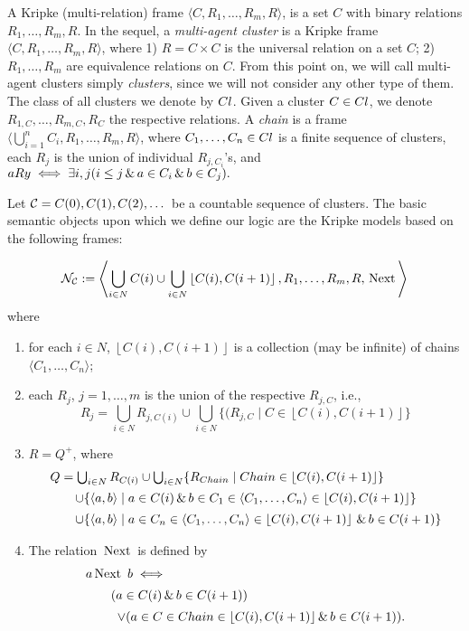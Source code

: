 \documentclass[runningheads]{llncs}
\begin{document}
  A Kripke (multi-relation) frame
  $\langle C, R_1,\dots, R_m, R\rangle$, is a set $C$ with binary relations
  $R_1,\dots, R_m, R$.
  In the sequel, a \emph{multi-agent cluster} is a Kripke frame
  $\langle C,R_1,\dots, R_m, R\rangle$,
  where
  1) $R=C\times C$ is the universal relation on a set $C$;
  2) $R_1,\dots, R_m$ are equivalence relations on $C$.
    From this point on, we will call multi-agent clusters simply \emph{clusters},
  since we will not consider any other type of them.
  The class of all clusters we denote by $\mathop{Cl}\nolimits$.
    Given a cluster $C\in\mathop{Cl}\nolimits$, we denote
  $R_{1,C},\dots,R_{m,C},R_C$ the respective relations.
  A \emph{chain} is a frame
  $\langle\bigcup_{i=1}^n C_i,R_1,\dots, R_m, R\rangle$,
  where $C_1,\dots,C_n\in\mathop{Cl}\nolimits$ is a finite sequence
  of clusters, each $R_j$ is the union of individual
  $R_{j,C_i}$'s,
  and
  $  a R y \iff \exists i,j
  (i\leq j \,\&\, a\in C_i \,\&\, b\in C_{j}).
  $

    Let $\mathcal{C}=C(0),C(1),C(2),\dots$ be
  a countable sequence of clusters.
    The basic semantic objects upon which we define our logic are the
Kripke models based on the following frames:

 \[
\mathcal{N_C} :=
\left\langle
 \bigcup_{i\in N} C(i)\cup
\bigcup_{i\in N} \left\lfloor C(i),C(i+1)\right\rfloor,
R_1,\dots, R_m,
R, \,\mathrm{Next}\,
\right\rangle
\]
where
\begin{enumerate}
\item
  for each $i\in{N}$,
  $\left\lfloor C(i),C(i+1)\right\rfloor$
  is a collection (may be infinite) of chains $\langle C_1,\dots,C_n\rangle$;
\item
each $R_j$, $j=1,\dots,m$ is the union
of the respective $R_{j,C}$, i.e.,
$$
R_j=
\bigcup_{i\in {N}} R_{j,C(i)}\cup
\bigcup_{i\in {N}}
\{ (R_{j,C}\mid
C\in\left\lfloor C(i),C(i+1)\right\rfloor\}
$$
\item
  $R=Q^+$, where
$$
\begin{array}{l}
Q=
\bigcup_{i\in {N}} R_{C(i)}\cup
\bigcup_{i\in {N}}
\{ R_{Chain}\mid
Chain\in\left\lfloor C(i),C(i+1)\right\rfloor\}\\[0.5em]
\hskip2em
\cup
\{\langle a,b\rangle \mid a\in C(i)\,\&\, b\in C_1\in \langle C_1,\dots,C_n\rangle\in
 \left\lfloor C(i),C(i+1)\right\rfloor\} \\[0.5em]
\hskip2em
\cup
\{
\langle a,b\rangle \mid
a\in C_n\in \langle C_1,\dots,C_n\rangle\in
 \left\lfloor C(i),C(i+1)\right\rfloor
\,\&\,
b\in C(i+1)
\}
\end{array}
$$
 \item
The relation $\,\mathrm{Next}\,$ is defined by
$$
\begin{array}{l}
a  \,\mathrm{Next}\,\ b  \iff \\[0.5em]
\hskip2em
(a\in C(i)\,\&\, b\in C(i+1))\\[0.5em]
\hskip2.5em
\vee
(a\in C\in Chain\in \lfloor C(i),C(i+1)\rfloor
\,\&\, b\in C(i+1)).
\end{array}
$$
\end{enumerate}
\end{document}
